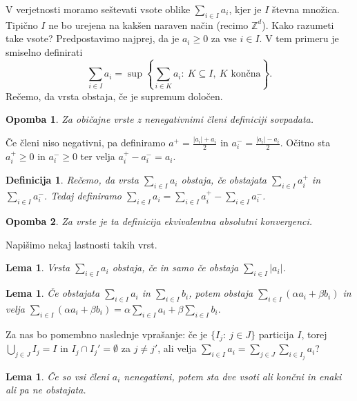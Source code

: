 \documentclass[10pt, a4paper]{article}
\newtheorem{defi}[izr]{Definicija}
\newenvironment{noticeB}{%
  \tcolorbox[%
  notitle,
  empty,
  enhanced,  %
  breakable,
  coltext=black,
  colback=white, 
  fontupper=\rmfamily,
  noparskip,
  sharp corners,
  boxrule=-1pt,  %
  frame hidden,
  left=7pt,  %
  right=7pt,
  top=5pt,
  bottom=5pt,
  before skip=2.5ex plus 2pt,
  after skip=2.5ex plus 2pt,
  borderline west = {1.5pt}{-0.1pt}{blue!30!black}, %
  overlay unbroken and last={%
    \draw[color=black, line width=1.25pt]
    ($(frame.south west)+(1.pt, -0.1pt)$) -- ++(2em, 0);
  }
  ]}
{\endtcolorbox}
\newenvironment{definicija}{\begin{noticeB}\begin{defi}}{%
    \end{defi}\end{noticeB}}
\newtheorem*{opomba}{Opomba}
\newtheorem{lema}[izr]{Lema}
\newcommand{\Z}{\mathbb {Z}}
\begin{document}
V verjetnosti moramo seštevati vsote oblike $\sum_{i \in I} a_i$,
kjer je $I$ števna množica. Tipično $I$ ne bo urejena na kakšen naraven način 
(recimo $\Z^d$). Kako razumeti take vsote? Predpostavimo najprej, da je $a_i \geq 0$ za vse $i \in I$.
V tem primeru je smiselno definirati 
$$\sum_{i \in I} a_i = \sup \left\lbrace \sum_{i \in K} a_i:\ K \subseteq I,\ \text{$K$ končna} \right\rbrace.$$
Rečemo, da vrsta obstaja, če je supremum določen.

\begin{opomba}
  Za običajne vrste z nenegativnimi členi definiciji sovpadata.
\end{opomba}

Če členi niso negativni, pa definiramo $a^+ = \frac{|a_i| + a_i}{2}$ in $a_i^- = \frac{|a_i| - a_i}{2}$.
Očitno sta $a_i ^+ \geq 0$ in $a_i^- \geq 0$ ter velja $a_i^+ - a_i^- = a_i$.

\begin{definicija}
  Rečemo, da vrsta $\sum_{i \in I} a_i$ obstaja, če obstajata $\sum_{i \in I}a_i^+$ in $\sum_{i \in I} a_i^-$.
  Tedaj definiramo $\sum_{i \in I} a_i = \sum_{i \in I} a_i^+ - \sum_{i \in I} a_i^-$. 
\end{definicija}

\begin{opomba}
  Za vrste je ta definicija ekvivalentna absolutni konvergenci.
\end{opomba}

Napišimo nekaj lastnosti takih vrst.

\begin{lema}
  Vrsta $\sum_{i \in I} a_i$ obstaja, če in samo če obstaja $\sum_{i \in I} |a_i|$.
\end{lema}

\begin{lema}
  Če obstajata $\sum_{i \in I} a_i$ in $\sum_{i \in I} b_i$, potem obstaja $\sum_{i \in I} (\alpha a_i + \beta b_i)$
  in velja $\sum_{i \in I} (\alpha a_i + \beta b_i) = \alpha \sum_{i \in I} a_i + \beta \sum_{i \in I} b_i.$ 
\end{lema}

Za nas bo pomembno naslednje vprašanje: če je $\{I_j:\ j \in J\}$ particija $I$,
torej $\bigcup_{j \in J} I_j = I$ in $I_j \cap I_j' = \emptyset$ za $j \neq j'$,
ali velja $\sum_{i \in I} a_i = \sum_{j \in J} \sum_{i \in I_j} a_i$?

\begin{lema}
  Če so vsi členi $a_i$ nenegativni, potem sta dve vsoti ali končni in enaki ali pa ne obstajata.
\end{lema}
\end{document}
